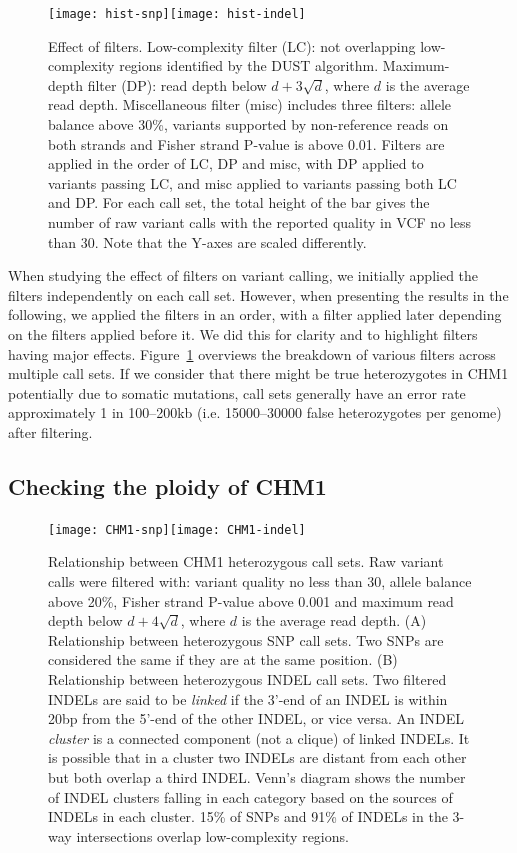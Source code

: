 \documentclass{bioinfo}
\begin{document}
\begin{figure}[!ht]
\texttt{[image: hist-snp]}\texttt{[image: hist-indel]}
\caption{Effect of filters. Low-complexity filter (LC): not overlapping
low-complexity regions identified by the DUST algorithm. Maximum-depth filter
(DP): read depth below $d+3\sqrt{d}$, where $d$ is the average read depth.
Miscellaneous filter (misc) includes three filters: allele balance above 30\%,
variants supported by non-reference reads on both strands and Fisher strand
P-value is above 0.01. Filters are applied in the order of LC, DP and misc,
with DP applied to variants passing LC, and misc applied to variants passing
both LC and DP. For each call set, the total height of the bar gives the
number of raw variant calls with the reported quality in VCF no less than 30.
Note that the Y-axes are scaled differently.}\label{fig:hist}
\end{figure}

When studying the effect of filters on variant calling, we initially applied
the filters independently on each call set. However, when presenting the
results in the following, we applied the filters in an order, with a filter
applied later depending on the filters applied before it. We did this for
clarity and to highlight filters having major effects. Figure~\ref{fig:hist}
overviews the breakdown of various filters across multiple call sets.
If we consider that there might be true heterozygotes in CHM1 potentially due
to somatic mutations, call sets generally have an error rate approximately 1 in
100--200kb (i.e. 15000--30000 false heterozygotes per genome) after filtering.

\subsection{Checking the ploidy of CHM1}

\begin{figure}
\texttt{[image: CHM1-snp]}\texttt{[image: CHM1-indel]}
\caption{Relationship between CHM1 heterozygous call sets. Raw variant calls were filtered
with: variant quality no less than 30, allele balance above 20\%, Fisher strand
P-value above 0.001 and maximum read depth below $d+4\sqrt{d}$, where $d$ is
the average read depth. (A) Relationship between heterozygous SNP call sets. Two SNPs are
considered the same if they are at the same position. (B) Relationship between heterozygous
INDEL call sets. Two filtered INDELs are said to be \emph{linked} if the 3'-end
of an INDEL is within 20bp from the 5'-end of the other INDEL, or vice versa.
An INDEL \emph{cluster} is a connected component (not a clique) of linked
INDELs. It is possible that in a cluster two INDELs are distant from each other
but both overlap a third INDEL.  Venn's diagram shows the number of INDEL
clusters falling in each category based on the sources of INDELs in each
cluster. 15\% of SNPs and 91\% of INDELs in the 3-way intersections overlap
low-complexity regions.}\label{fig:venn-CHM1}
\end{figure}
\end{document}

